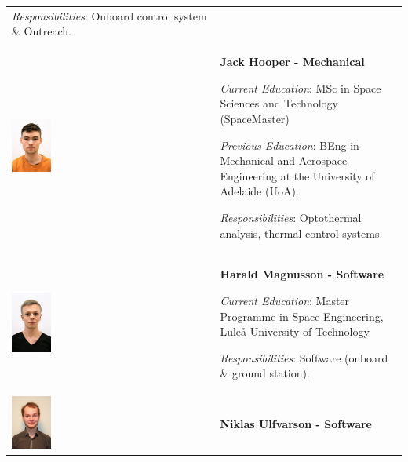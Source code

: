 \begin{longtable}[]{m{} m{}}
\smallskip
\textit{Responsibilities}: Onboard control system \& Outreach.
\bigskip
\\

\includegraphics[width=0.2\textwidth]{0-cover/img/TEAMPICS/Jack_Final.jpg}  & \textbf{Jack Hooper - Mechanical}

\smallskip
\textit{Current Education}: MSc in Space Sciences and Technology (SpaceMaster)

\smallskip
\textit{Previous Education}: BEng in Mechanical and Aerospace Engineering at the University of Adelaide (UoA). 

\smallskip
\textit{Responsibilities}: Optothermal analysis, thermal control systems.
\bigskip
\\


\includegraphics[width=0.2\textwidth]{0-cover/img/TEAMPICS/Harald_final.jpg}  & \textbf{Harald Magnusson - Software}

\smallskip
\textit{Current Education}: Master Programme in Space Engineering, Luleå University of Technology

\smallskip
\textit{Responsibilities}: Software (onboard \& ground station).
\bigskip
\\

\includegraphics[width=0.2\textwidth]{0-cover/img/TEAMPICS/Niklas_final.jpg}  & \textbf{Niklas Ulfvarson - Software}


\end{longtable}
